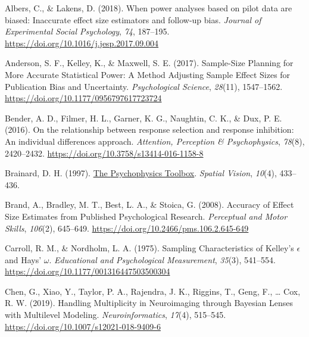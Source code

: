 \documentclass[
  man]{apa6}
\newlength{\cslhangindent}
\newlength{\cslentryspacingunit} %
\newenvironment{CSLReferences}[2] %
 {%
  \setlength{\parindent}{0pt}
  \ifodd #1
  \let\oldpar\par
  \def\par{\hangindent=\cslhangindent\oldpar}
  \fi
  \setlength{\parskip}{#2\cslentryspacingunit}
 }%
 {}
\begin{document}
\hypertarget{refs}{}
\begin{CSLReferences}{1}{0}
\leavevmode{}%
Albers, C., \& Lakens, D. (2018). When power analyses based on pilot data are biased: {Inaccurate} effect size estimators and follow-up bias. \emph{Journal of Experimental Social Psychology}, \emph{74}, 187--195. \url{https://doi.org/10.1016/j.jesp.2017.09.004}

\leavevmode{}%
Anderson, S. F., Kelley, K., \& Maxwell, S. E. (2017). Sample-{Size Planning} for {More Accurate Statistical Power}: {A Method Adjusting Sample Effect Sizes} for {Publication Bias} and {Uncertainty}. \emph{Psychological Science}, \emph{28}(11), 1547--1562. \url{https://doi.org/10.1177/0956797617723724}

\leavevmode{}%
Bender, A. D., Filmer, H. L., Garner, K. G., Naughtin, C. K., \& Dux, P. E. (2016). On the relationship between response selection and response inhibition: {An} individual differences approach. \emph{Attention, Perception \& Psychophysics}, \emph{78}(8), 2420--2432. \url{https://doi.org/10.3758/s13414-016-1158-8}

\leavevmode{}%
Brainard, D. H. (1997). \href{https://www.ncbi.nlm.nih.gov/pubmed/9176952}{The {Psychophysics Toolbox}}. \emph{Spatial Vision}, \emph{10}(4), 433--436.

\leavevmode{}%
Brand, A., Bradley, M. T., Best, L. A., \& Stoica, G. (2008). Accuracy of {Effect Size Estimates} from {Published Psychological Research}. \emph{Perceptual and Motor Skills}, \emph{106}(2), 645--649. \url{https://doi.org/10.2466/pms.106.2.645-649}

\leavevmode{}%
Carroll, R. M., \& Nordholm, L. A. (1975). Sampling {Characteristics} of {Kelley}'s {\(\epsilon\)} and {Hays}' {\(\omega\)}. \emph{Educational and Psychological Measurement}, \emph{35}(3), 541--554. \url{https://doi.org/10.1177/001316447503500304}

\leavevmode{}%
Chen, G., Xiao, Y., Taylor, P. A., Rajendra, J. K., Riggins, T., Geng, F., \ldots{} Cox, R. W. (2019). Handling {Multiplicity} in {Neuroimaging} through {Bayesian Lenses} with {Multilevel Modeling}. \emph{Neuroinformatics}, \emph{17}(4), 515--545. \url{https://doi.org/10.1007/s12021-018-9409-6}


\end{CSLReferences}
\end{document}
